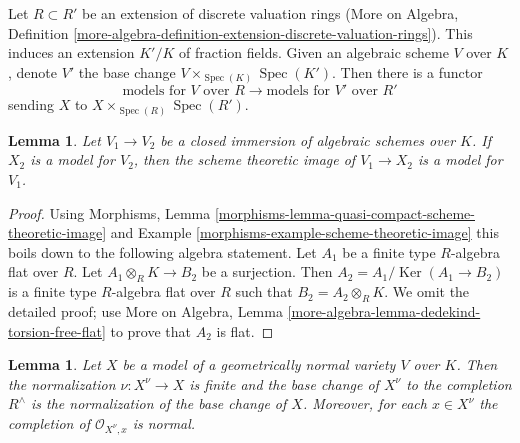 \documentclass{stacks-project}
\theoremstyle{plain}
\newtheorem{lemma}[subsection]{Lemma}
\theoremstyle{definition}
\theoremstyle{remark}
\numberwithin{equation}{subsection}
\def\Spec{\mathop{\mathrm{Spec}}}
\def\Ker{\mathop{\mathrm{Ker}}}
\begin{document}
\medskip\noindent
Let $R \subset R'$ be an extension of discrete valuation rings
(More on Algebra, Definition
\ref{more-algebra-definition-extension-discrete-valuation-rings}).
This induces an extension $K'/K$ of fraction fields.
Given an algebraic scheme $V$ over $K$, denote $V'$ the
base change $V \times_{\Spec(K)} \Spec(K')$. Then there is
a functor
$$
\text{models for }V\text{ over }R
\longrightarrow
\text{models for }V'\text{ over }R'
$$
sending $X$ to $X \times_{\Spec(R)} \Spec(R')$.

\begin{lemma}
\label{lemma-closure-is-model}
Let $V_1 \to V_2$ be a closed immersion of algebraic schemes over $K$.
If $X_2$ is a model for $V_2$, then the scheme theoretic image
of $V_1 \to X_2$ is a model for $V_1$.
\end{lemma}

\begin{proof}
Using
Morphisms, Lemma \ref{morphisms-lemma-quasi-compact-scheme-theoretic-image} and
Example \ref{morphisms-example-scheme-theoretic-image}
this boils down to the following algebra statement.
Let $A_1$ be a finite type $R$-algebra flat over $R$.
Let $A_1 \otimes_R K \to B_2$ be a surjection. Then
$A_2 = A_1 / \Ker(A_1 \to B_2)$ is a finite type $R$-algebra
flat over $R$ such that $B_2 = A_2 \otimes_R K$.
We omit the detailed proof; use
More on Algebra, Lemma \ref{more-algebra-lemma-dedekind-torsion-free-flat}
to prove that $A_2$ is flat.
\end{proof}

\begin{lemma}
\label{lemma-normalization}
Let $X$ be a model of a geometrically normal variety $V$ over $K$.
Then the normalization $\nu : X^\nu \to X$ is finite and
the base change of $X^\nu$ to the completion $R^\wedge$
is the normalization of the base change of $X$. Moreover, for
each $x \in X^\nu$ the completion of $\mathcal{O}_{X^\nu, x}$
is normal.
\end{lemma}
\end{document}
